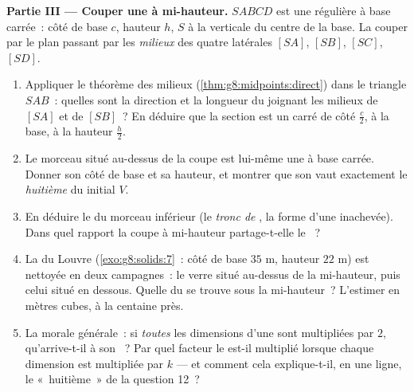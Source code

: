 \begin{problem}
\medskip
\noindent\textbf{Partie III --- Couper une  à mi-hauteur.}
$SABCD$ est une  régulière à base carrée~: côté de base $c$,
hauteur $h$,  $S$ à la verticale du centre de la base. La
couper par le plan passant par les \emph{milieux} des quatre 
latérales $[SA]$, $[SB]$, $[SC]$, $[SD]$.
\begin{enumerate}[resume]
  \item Appliquer le théorème des milieux
        (\cref{thm:g8:midpoints:direct}) dans le triangle $SAB$~:
        quelles sont la direction et la longueur du  joignant
        les milieux de $[SA]$ et de $[SB]$~? En déduire que la
        section est un carré de côté $\frac{c}{2}$,  à la
        base, à la hauteur $\frac{h}{2}$.
  \item Le morceau situé au-dessus de la coupe est lui-même une
         à base carrée. Donner son côté de base et sa
        hauteur, et montrer que son  vaut exactement le
        \emph{huitième} du  initial $V$.
  \item En déduire le  du morceau inférieur (le \emph{tronc de
        }, la forme d'une  inachevée). Dans quel
        rapport la coupe à mi-hauteur partage-t-elle le ~?
  \item La  du Louvre (\cref{exo:g8:solids:7}~: côté de base
        $35$ m, hauteur $22$ m) est nettoyée en deux campagnes~: le
        verre situé au-dessus de la mi-hauteur, puis celui situé en
        dessous. Quelle  du \emph{} se trouve sous la
        mi-hauteur~? L'estimer en mètres cubes, à la centaine près.
  \item La morale générale~: si \emph{toutes} les dimensions d'une
         sont multipliées par $2$, qu'arrive-t-il à son
        ~? Par quel facteur le  est-il multiplié lorsque
        chaque dimension est multipliée par $k$ --- et comment cela
        explique-t-il, en une ligne, le «~huitième~» de la question
        12~?
\end{enumerate}
\end{problem}
